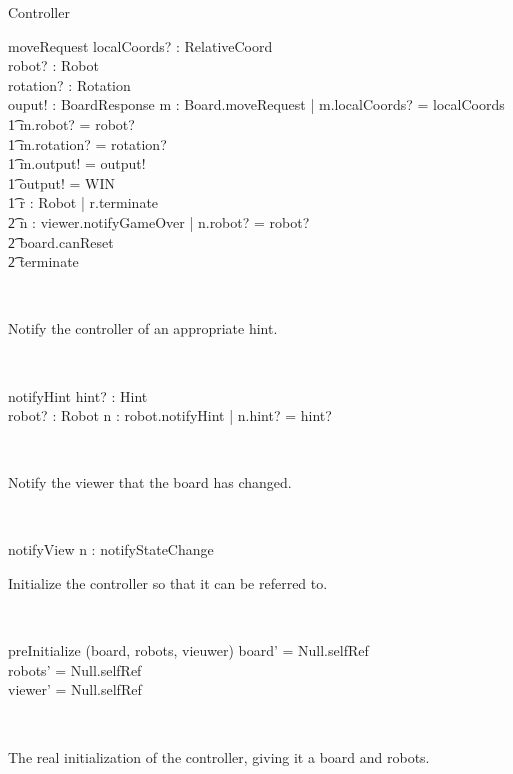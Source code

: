 \begin{class}{Controller}
\begin{schema}{moveRequest}
localCoords? : RelativeCoord \\
robot? : Robot \\
rotation? : Rotation \\
ouput! : BoardResponse
\where
\exists m : Board.moveRequest | m.localCoords? = localCoords \\ \t1
m.robot? = robot? \\ \t1
m.rotation? = rotation? \\ \t1
m.output! = output! \\ \t1
\IF output! = WIN \\ \t1
\THEN \forall r : Robot | r.terminate \\ \t2
\exists n : viewer.notifyGameOver | n.robot? = robot? \\ \t2
board.canReset \\ \t2
terminate
\end{schema}\\
\begin{classcom}
Notify the controller of an appropriate hint.
\end{classcom} \\
\begin{schema}{notifyHint}
hint? : Hint \\
robot? : Robot
\where
\exists n : robot.notifyHint | n.hint? = hint?
\end{schema}\\
\begin{classcom}
Notify the viewer that the board has changed.
\end{classcom} \\
\begin{schema}{notifyView}
\where
\exists n : notifyStateChange
\end{schema}
\znewpage
\begin{classcom}
Initialize the controller so that it can be referred to.
\end{classcom} \\
\begin{schema}{preInitialize}
\Delta (board, robots, vieuwer)
\where
board' = Null.selfRef \\
robots' = Null.selfRef \\
viewer' = Null.selfRef
\end{schema}\\
\begin{classcom}
The real initialization of the controller, giving it a board and robots.
\end{classcom} \\

\end{class}
